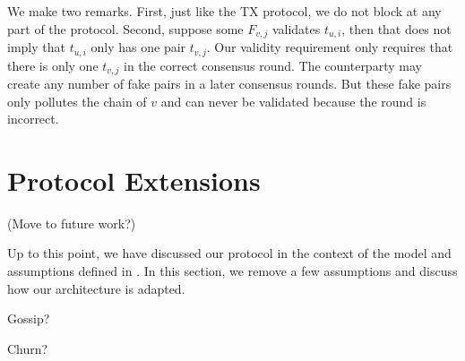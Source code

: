We make two remarks.
First, just like the TX protocol, we do not block at any part of the protocol.
Second, suppose some $F_{v, j}$ validates $t_{u, i}$, then that does not imply that $t_{u, i}$ only has one pair $t_{v, j}$.
Our validity requirement only requires that there is only one $t_{v, j}$ in the correct consensus round.
The counterparty may create any number of fake pairs in a later consensus rounds.
But these fake pairs only pollutes the chain of $v$ and can never be validated because the round is incorrect.

\section{Protocol Extensions}
\label{sec:protocol-extensions}

(Move to future work?)

Up to this point, we have discussed our protocol in the context of the model and assumptions defined in .
In this section, we remove a few assumptions and discuss how our architecture is adapted.

Gossip?

Churn?



